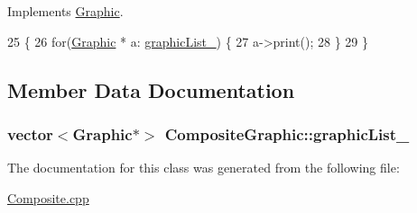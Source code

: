 Implements \hyperlink{classGraphic_ab9307ecd30324ec5018ca7d1e88781b9}{Graphic}.


\begin{DoxyCode}
25                      \{
26     \textcolor{keywordflow}{for}(\hyperlink{classGraphic}{Graphic} * a: \hyperlink{classCompositeGraphic_a3ba19dd348b3579bd2624c964a43422c}{graphicList\_}) \{
27       a->print();
28     \}
29   \}
\end{DoxyCode}


\subsection{Member Data Documentation}
\subsubsection[{\texorpdfstring{graphic\+List\+\_\+}{graphicList_}}]{\setlength{\rightskip}{0pt plus 5cm}vector$<${\bf Graphic}$\ast$$>$ Composite\+Graphic\+::graphic\+List\+\_\+\hspace{0.3cm}{\ttfamily [private]}}\hypertarget{classCompositeGraphic_a3ba19dd348b3579bd2624c964a43422c}{}\label{classCompositeGraphic_a3ba19dd348b3579bd2624c964a43422c}


The documentation for this class was generated from the following file\+:\begin{DoxyCompactItemize}
\item 
\hyperlink{Composite_8cpp}{Composite.\+cpp}\end{DoxyCompactItemize}
